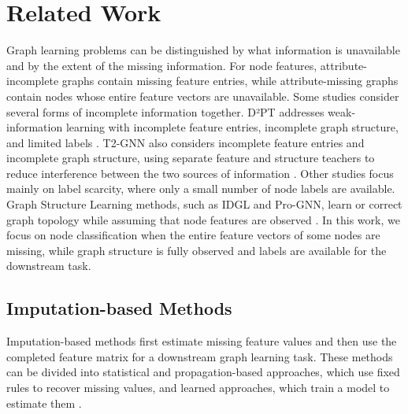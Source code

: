 \section{Related Work}
Graph learning problems can be distinguished by what information is unavailable and by the extent of the missing information. For node features, attribute-incomplete graphs contain missing feature entries, while attribute-missing graphs contain nodes whose entire feature vectors are unavailable. Some studies consider several forms of incomplete information together. D²PT addresses weak-information learning with incomplete feature entries, incomplete graph structure, and limited labels \cite{liu2023learning}. T2-GNN also considers incomplete feature entries and incomplete graph structure, using separate feature and structure teachers to reduce interference between the two sources of information \cite{huo2023t2}. Other studies focus mainly on label scarcity, where only a small number of node labels are available. Graph Structure Learning methods, such as IDGL and Pro-GNN, learn or correct graph topology while assuming that node features are observed \cite{chen2020iterative,jin2020graph}. In this work, we focus on node classification when the entire feature vectors of some nodes are missing, while graph structure is fully observed and labels are available for the downstream task.
\label{sec:related}

\subsection{Imputation-based Methods}
Imputation-based methods first estimate missing feature values and then use the completed feature matrix for a downstream graph learning task. These methods can be divided into statistical and propagation-based approaches, which use fixed rules to recover missing values, and learned approaches, which train a model to estimate them \cite{rossi2022unreasonable,yoo2022accurate}.

